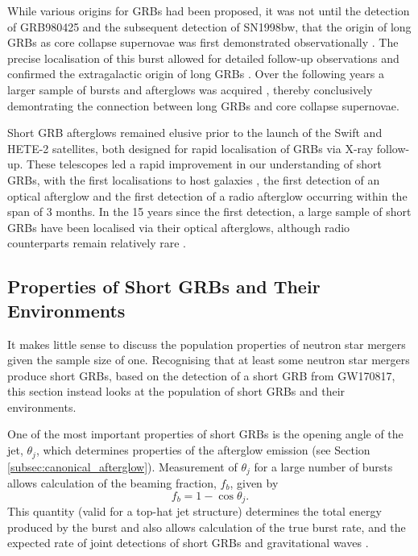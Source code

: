 While various origins for GRBs had been proposed, it was not until the detection of GRB980425 and the subsequent detection of SN1998bw, that the origin of long GRBs as core collapse supernovae was first demonstrated observationally \citep[][and references therein]{2012grb..book..169H}. The precise localisation of this burst allowed for detailed follow-up observations and confirmed the extragalactic origin of long GRBs \citep{1998Natur.395..670G}. Over the following years a larger sample of bursts and afterglows was acquired \citep[e.g.][]{2016ApJ...832..108M}, thereby conclusively demontrating the connection between long GRBs and core collapse supernovae.

Short GRB afterglows remained elusive prior to the launch of the Swift and HETE-2 satellites, both designed for rapid localisation of GRBs via X-ray follow-up. These telescopes led a rapid improvement in our understanding of short GRBs, with the first localisations to host galaxies \citep{2005Natur.437..851G}, the first detection of an optical afterglow \citep{2005Natur.437..859H,2005Natur.437..845F} and the first detection of a radio afterglow \citep{2005Natur.438..988B} occurring within the span of 3 months. In the 15 years since the first detection, a large sample of short GRBs have been localised via their optical afterglows, although radio counterparts remain relatively rare \citep{2015ApJ...815..102F,2016ApJ...829....7L}.

\subsection{Properties of Short GRBs and Their Environments}
It makes little sense to discuss the population properties of neutron star mergers given the sample size of one. Recognising that at least some neutron star mergers produce short GRBs, based on the detection of a short GRB from GW170817, this section instead looks at the population of short GRBs and their environments.

One of the most important properties of short GRBs is the opening angle of the jet, $\theta_j$, which determines properties of the afterglow emission (see Section \ref{subsec:canonical_afterglow}). Measurement of $\theta_j$ for a large number of bursts allows calculation of the beaming fraction, $f_b$, given by
\begin{equation}
    f_b = 1-\cos\theta_j.
\end{equation}
This quantity (valid for a top-hat jet structure) determines the total energy produced by the burst and also allows calculation of the true burst rate, and the expected rate of joint detections of short GRBs and gravitational waves \citep{2019MNRAS.485.1435H}.

